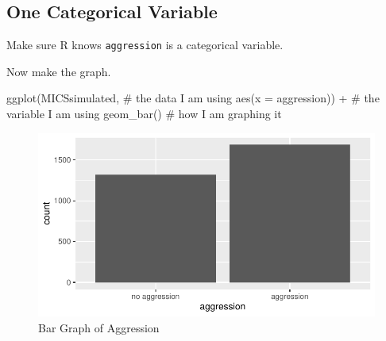 \documentclass[
  letterpaper,
  DIV=11,
  numbers=noendperiod]{scrreprt}
\newenvironment{Shaded}{\begin{snugshade}}{\end{snugshade}}
\newcommand{\AttributeTok}[1]{\textcolor[rgb]{0.40,0.45,0.13}{#1}}
\newcommand{\CommentTok}[1]{\textcolor[rgb]{0.37,0.37,0.37}{#1}}
\newcommand{\ConstantTok}[1]{\textcolor[rgb]{0.56,0.35,0.01}{#1}}
\newcommand{\DecValTok}[1]{\textcolor[rgb]{0.68,0.00,0.00}{#1}}
\newcommand{\FunctionTok}[1]{\textcolor[rgb]{0.28,0.35,0.67}{#1}}
\newcommand{\NormalTok}[1]{\textcolor[rgb]{0.00,0.23,0.31}{#1}}
\newcommand{\OtherTok}[1]{\textcolor[rgb]{0.00,0.23,0.31}{#1}}
\newcommand{\SpecialCharTok}[1]{\textcolor[rgb]{0.37,0.37,0.37}{#1}}
\newcommand{\StringTok}[1]{\textcolor[rgb]{0.13,0.47,0.30}{#1}}
\begin{document}
\hypertarget{one-categorical-variable}{%
\subsection{One Categorical Variable}\label{one-categorical-variable}}

Make sure R knows \texttt{aggression} is a categorical variable.

\begin{Shaded}
\end{Shaded}

Now make the graph.

\begin{Shaded}
\begin{Highlighting}[]
\FunctionTok{ggplot}\NormalTok{(MICSsimulated, }\CommentTok{\# the data I am using}
       \FunctionTok{aes}\NormalTok{(}\AttributeTok{x =}\NormalTok{ aggression)) }\SpecialCharTok{+} \CommentTok{\# the variable I am using}
  \FunctionTok{geom\_bar}\NormalTok{() }\CommentTok{\# how I am graphing it}
\end{Highlighting}
\end{Shaded}

\begin{figure}[H]

{\centering \includegraphics{quick-intro-ggplot2_files/figure-pdf/fig-ggplot-bar-1.pdf}

}

\caption{\label{fig-ggplot-bar}Bar Graph of Aggression}

\end{figure}
\end{document}

